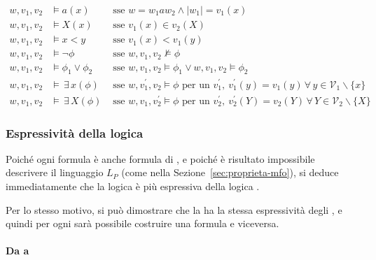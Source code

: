 \documentclass[italian, 10pt]{article}
\begin{document}
\begin{align*}
  w, v_1, v_2 & \vDash  a(x)                 & \text{ sse } w = w_1 a w_2 \land |w_1| = v_1(x)                                                                                                     \\
  w, v_1, v_2 & \vDash X(x)                  & \text{ sse } v_1(x) \in v_2(X)                                                                                                                      \\
  w, v_1, v_2 & \vDash x < y                 & \text{ sse } v_1(x) < v_1(y)                                                                                                                        \\
  w, v_1, v_2 & \vDash \lnot \phi            & \text{ sse } w, v_1, v_2 \nvDash \phi                                                                                                               \\
  w, v_1, v_2 & \vDash \phi_1 \lor \phi_2    & \text{ sse } w, v_1, v_2 \vDash \phi_1 \lor     w, v_1, v_2 \vDash \phi_2                                                                           \\
  w, v_1, v_2 & \vDash \, \exists \, x(\phi) & \text{ sse } w, v^\prime_1, v_2 \vDash \phi \text{ per un } v^\prime_1, \ v^\prime_1(y) = v_1(y) \, \forall \, y \in \mathcal{V}_1 \backslash \{x\} \\
  w, v_1, v_2 & \vDash \, \exists \, X(\phi) & \text{ sse } w, v_1, v^\prime_2 \vDash \phi \text{ per un } v^\prime_2, \ v^\prime_2(Y) = v_2(Y) \, \forall \, Y \in \mathcal{V}_2 \backslash \{X\}
\end{align*}

\subsubsection{Espressività della logica \MSO}

Poiché ogni formula \MFO è anche formula di \MSO, e poiché è risultato impossibile descrivere il linguaggio \(L_P\) (come nella Sezione~\ref{sec:proprieta-mfo}), si deduce immediatamente che la logica \MSO è più espressiva della logica \MFO.

Per lo stesso motivo, si può dimostrare che la \MSO ha la stessa espressività degli \FSA, e quindi per ogni \FSA sarà possibile costruire una formula \MSO e viceversa.

\paragraph{Da \FSA a \MSO}
\end{document}
